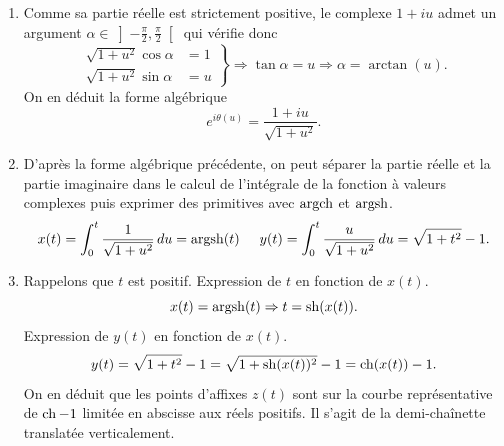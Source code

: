 \begin{enumerate}
  \item Comme sa partie réelle est strictement positive, le complexe $1+iu$ admet un argument $\alpha\in\left] -\frac{\pi}{2}, \frac{\pi}{2}\right[$ qui vérifie donc 
\begin{displaymath}
\left. 
\begin{aligned}
\sqrt{1+u^2}\cos \alpha &= 1 \\ \sqrt{1+u^2}\sin \alpha &= u  
\end{aligned}
\right\rbrace \Rightarrow \tan \alpha = u \Rightarrow \alpha = \arctan(u) .
\end{displaymath}
On en déduit la forme algébrique
\begin{displaymath}
  e^{i\theta(u)} = \frac{1+iu}{\sqrt{1+u^2}}.
\end{displaymath}

  \item D'après la forme algébrique précédente, on peut séparer la partie réelle et la partie imaginaire dans le calcul de l'intégrale de la fonction à valeurs complexes puis exprimer des primitives avec $\operatorname{argch}$ et $\operatorname{argsh}$.
\begin{displaymath}
x(t) = \int_0^{t}\frac{1}{\sqrt{1+u^2}}\,du =  \operatorname{argsh}(t) \hspace{0.5cm}
y(t) = \int_0^{t}\frac{u}{\sqrt{1+u^2}}\,du = \sqrt{1+t^2}-1 .
\end{displaymath}

  \item Rappelons que $t$ est positif.\newline
Expression de $t$ en fonction de $x(t)$.
\begin{displaymath}
x(t) = \operatorname{argsh}(t) \Rightarrow t = \operatorname{sh}(x(t)).
\end{displaymath}
Expression de $y(t)$ en fonction de $x(t)$.
\begin{displaymath}
y(t) = \sqrt{1+t^2}-1 = \sqrt{1+\operatorname{sh}(x(t))^2} -1 = \operatorname{ch}(x(t)) - 1 .
\end{displaymath}
On en déduit que les points d'affixes $z(t)$ sont sur la courbe représentative de $\operatorname{ch} -1$ limitée en abscisse aux réels positifs. Il s'agit de la demi-chaînette translatée verticalement. 
\end{enumerate}
